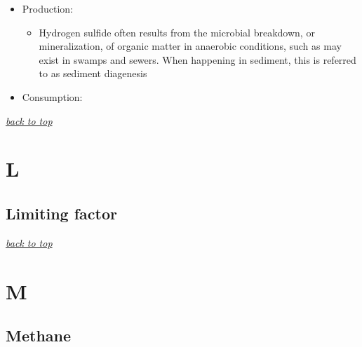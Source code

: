 \documentclass[]{book}
\providecommand{\tightlist}{%
  \setlength{\itemsep}{0pt}\setlength{\parskip}{0pt}}
\theoremstyle{definition}
\theoremstyle{definition}
\theoremstyle{definition}
\theoremstyle{remark}
\begin{document}
\begin{itemize}
\tightlist
\item
  Production:

  \begin{itemize}
  \tightlist
  \item
    Hydrogen sulfide often results from the microbial breakdown, or
    mineralization, of organic matter in anaerobic conditions, such as
    may exist in swamps and sewers. When happening in sediment, this is
    referred to as sediment diagenesis
  \end{itemize}
\item
  Consumption:
\end{itemize}

\emph{\protect\hyperlink{top}{back to top}}

\section{L}\label{l}

\subsection{Limiting factor}\label{limiting-factor}

\emph{\protect\hyperlink{top}{back to top}}

\section{M}\label{m}

\subsection{Methane}\label{methane}
\end{document}

